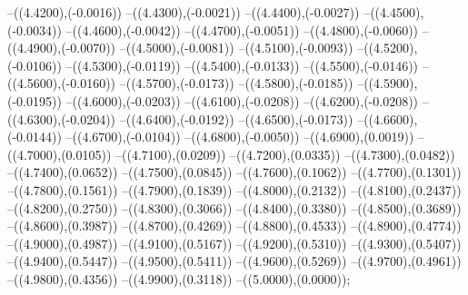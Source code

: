 {	--({\sx*(4.4200)},{\sy*(-0.0016)})
	--({\sx*(4.4300)},{\sy*(-0.0021)})
	--({\sx*(4.4400)},{\sy*(-0.0027)})
	--({\sx*(4.4500)},{\sy*(-0.0034)})
	--({\sx*(4.4600)},{\sy*(-0.0042)})
	--({\sx*(4.4700)},{\sy*(-0.0051)})
	--({\sx*(4.4800)},{\sy*(-0.0060)})
	--({\sx*(4.4900)},{\sy*(-0.0070)})
	--({\sx*(4.5000)},{\sy*(-0.0081)})
	--({\sx*(4.5100)},{\sy*(-0.0093)})
	--({\sx*(4.5200)},{\sy*(-0.0106)})
	--({\sx*(4.5300)},{\sy*(-0.0119)})
	--({\sx*(4.5400)},{\sy*(-0.0133)})
	--({\sx*(4.5500)},{\sy*(-0.0146)})
	--({\sx*(4.5600)},{\sy*(-0.0160)})
	--({\sx*(4.5700)},{\sy*(-0.0173)})
	--({\sx*(4.5800)},{\sy*(-0.0185)})
	--({\sx*(4.5900)},{\sy*(-0.0195)})
	--({\sx*(4.6000)},{\sy*(-0.0203)})
	--({\sx*(4.6100)},{\sy*(-0.0208)})
	--({\sx*(4.6200)},{\sy*(-0.0208)})
	--({\sx*(4.6300)},{\sy*(-0.0204)})
	--({\sx*(4.6400)},{\sy*(-0.0192)})
	--({\sx*(4.6500)},{\sy*(-0.0173)})
	--({\sx*(4.6600)},{\sy*(-0.0144)})
	--({\sx*(4.6700)},{\sy*(-0.0104)})
	--({\sx*(4.6800)},{\sy*(-0.0050)})
	--({\sx*(4.6900)},{\sy*(0.0019)})
	--({\sx*(4.7000)},{\sy*(0.0105)})
	--({\sx*(4.7100)},{\sy*(0.0209)})
	--({\sx*(4.7200)},{\sy*(0.0335)})
	--({\sx*(4.7300)},{\sy*(0.0482)})
	--({\sx*(4.7400)},{\sy*(0.0652)})
	--({\sx*(4.7500)},{\sy*(0.0845)})
	--({\sx*(4.7600)},{\sy*(0.1062)})
	--({\sx*(4.7700)},{\sy*(0.1301)})
	--({\sx*(4.7800)},{\sy*(0.1561)})
	--({\sx*(4.7900)},{\sy*(0.1839)})
	--({\sx*(4.8000)},{\sy*(0.2132)})
	--({\sx*(4.8100)},{\sy*(0.2437)})
	--({\sx*(4.8200)},{\sy*(0.2750)})
	--({\sx*(4.8300)},{\sy*(0.3066)})
	--({\sx*(4.8400)},{\sy*(0.3380)})
	--({\sx*(4.8500)},{\sy*(0.3689)})
	--({\sx*(4.8600)},{\sy*(0.3987)})
	--({\sx*(4.8700)},{\sy*(0.4269)})
	--({\sx*(4.8800)},{\sy*(0.4533)})
	--({\sx*(4.8900)},{\sy*(0.4774)})
	--({\sx*(4.9000)},{\sy*(0.4987)})
	--({\sx*(4.9100)},{\sy*(0.5167)})
	--({\sx*(4.9200)},{\sy*(0.5310)})
	--({\sx*(4.9300)},{\sy*(0.5407)})
	--({\sx*(4.9400)},{\sy*(0.5447)})
	--({\sx*(4.9500)},{\sy*(0.5411)})
	--({\sx*(4.9600)},{\sy*(0.5269)})
	--({\sx*(4.9700)},{\sy*(0.4961)})
	--({\sx*(4.9800)},{\sy*(0.4356)})
	--({\sx*(4.9900)},{\sy*(0.3118)})
	--({\sx*(5.0000)},{\sy*(0.0000)});
}
\def\xwertei{
\fill[color=red] (0.0000,0) circle[radius={0.07/\skala}];
\fill[color=red] (0.2778,0) circle[radius={0.07/\skala}];
\fill[color=red] (0.5556,0) circle[radius={0.07/\skala}];
\fill[color=red] (0.8333,0) circle[radius={0.07/\skala}];
\fill[color=red] (1.1111,0) circle[radius={0.07/\skala}];
\fill[color=red] (1.3889,0) circle[radius={0.07/\skala}];
\fill[color=red] (1.6667,0) circle[radius={0.07/\skala}];
\fill[color=red] (1.9444,0) circle[radius={0.07/\skala}];
\fill[color=red] (2.2222,0) circle[radius={0.07/\skala}];
\fill[color=red] (2.5000,0) circle[radius={0.07/\skala}];
\fill[color=red] (2.7778,0) circle[radius={0.07/\skala}];
\fill[color=red] (3.0556,0) circle[radius={0.07/\skala}];
\fill[color=red] (3.3333,0) circle[radius={0.07/\skala}];
\fill[color=red] (3.6111,0) circle[radius={0.07/\skala}];
\fill[color=red] (3.8889,0) circle[radius={0.07/\skala}];
\fill[color=red] (4.1667,0) circle[radius={0.07/\skala}];
\fill[color=red] (4.4444,0) circle[radius={0.07/\skala}];
\fill[color=red] (4.7222,0) circle[radius={0.07/\skala}];
\fill[color=red] (5.0000,0) circle[radius={0.07/\skala}];
}
